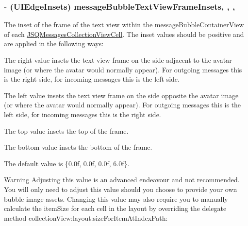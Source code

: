 \subsubsection[{message\+Bubble\+Text\+View\+Frame\+Insets}]{\setlength{\rightskip}{0pt plus 5cm}-\/ (U\+I\+Edge\+Insets) message\+Bubble\+Text\+View\+Frame\+Insets\hspace{0.3cm}{\ttfamily [read]}, {\ttfamily [write]}, {\ttfamily [nonatomic]}, {\ttfamily [assign]}}\label{interface_j_s_q_messages_collection_view_flow_layout_a7dff7bb4f08899a86faa8a7914ff7f53}
The inset of the frame of the text view within the {\ttfamily message\+Bubble\+Container\+View} of each {\ttfamily \hyperlink{interface_j_s_q_messages_collection_view_cell}{J\+S\+Q\+Messages\+Collection\+View\+Cell}}. The inset values should be positive and are applied in the following ways\+:


\begin{DoxyEnumerate}
\item The right value insets the text view frame on the side adjacent to the avatar image (or where the avatar would normally appear). For outgoing messages this is the right side, for incoming messages this is the left side.
\item The left value insets the text view frame on the side opposite the avatar image (or where the avatar would normally appear). For outgoing messages this is the left side, for incoming messages this is the right side.
\item The top value insets the top of the frame.
\item The bottom value insets the bottom of the frame.
\end{DoxyEnumerate}

The default value is {\ttfamily \{0.\+0f, 0.\+0f, 0.\+0f, 6.\+0f\}}.

\begin{DoxyWarning}{Warning}
Adjusting this value is an advanced endeavour and not recommended. You will only need to adjust this value should you choose to provide your own bubble image assets. Changing this value may also require you to manually calculate the item\+Size for each cell in the layout by overriding the delegate method {\ttfamily collection\+View\+:layout\+:size\+For\+Item\+At\+Index\+Path\+:} 
\end{DoxyWarning}
\hypertarget{interface_j_s_q_messages_collection_view_flow_layout_a2a696c1e239c9d8ec6f85fb4e298a33b}{}
